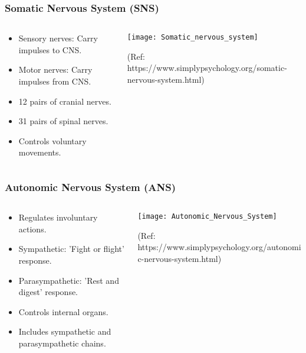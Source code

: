 \begin{frame}[fragile]\frametitle{Somatic Nervous System (SNS)}
\begin{columns}
    \begin{column}[T]{0.5\linewidth}
      \begin{itemize}
		\item Sensory nerves: Carry impulses to CNS.
		\item Motor nerves: Carry impulses from CNS.
		\item 12 pairs of cranial nerves.
		\item 31 pairs of spinal nerves.
		\item Controls voluntary movements.
	  \end{itemize}
    \end{column}
    \begin{column}[T]{0.5\linewidth}
		\begin{center}
		\texttt{[image: Somatic\_nervous\_system]}
		
		{\tiny (Ref: https://www.simplypsychology.org/somatic-nervous-system.html)}
		\end{center}	
    \end{column}
  \end{columns}
\end{frame}

\begin{frame}[fragile]\frametitle{Autonomic Nervous System (ANS)}
\begin{columns}
    \begin{column}[T]{0.5\linewidth}
      \begin{itemize}
		\item Regulates involuntary actions.
		\item Sympathetic: 'Fight or flight' response.
		\item Parasympathetic: 'Rest and digest' response.
		\item Controls internal organs.
		\item Includes sympathetic and parasympathetic chains.
	  \end{itemize}
    \end{column}
    \begin{column}[T]{0.5\linewidth}
		\begin{center}
		\texttt{[image: Autonomic\_Nervous\_System]}
		
		{\tiny (Ref: https://www.simplypsychology.org/autonomic-nervous-system.html)}
		\end{center}	
    \end{column}
  \end{columns}
\end{frame}


